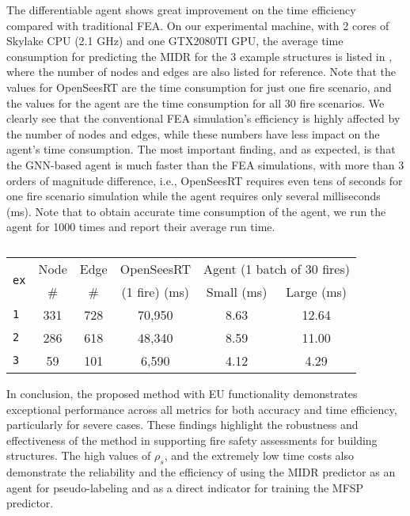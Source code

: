 {\blockRevise
The differentiable agent shows great improvement on the time efficiency compared with traditional FEA. On our experimental machine, with 2 cores of Skylake CPU (2.1 GHz) and one GTX2080TI GPU, the average time consumption for predicting the MIDR for the 3 example structures is listed in , where the number of nodes and edges are also listed for reference. Note that the values for OpenSeesRT are the time consumption for just one fire scenario, and the values for the agent are the time consumption for all 30 fire scenarios. We clearly see that the conventional FEA simulation's efficiency is highly affected by the number of nodes and edges, while these numbers have less impact on the agent's time consumption. The most important finding, and as expected, is that the GNN-based agent is much faster than the FEA simulations, with more than 3 orders of magnitude difference, i.e., OpenSeesRT requires even tens of seconds for one fire scenario simulation while the agent requires only several milliseconds (ms). Note that to obtain accurate time consumption of the agent, we run the agent for 1000 times and report their average run time.
\begin{table}[h!]
    \centering
    \caption{}
    \begin{tabular}{l|cc|ccc}
        \toprule
        \multirow{2}{*}{\texttt{ex}} & Node & Edge & OpenSeesRT & \multicolumn{2}{c}{Agent (1 batch of 30 fires)} \\ 
        \cmidrule(lr){5-6}
        & \# & \# & (1 fire) (ms) & Small (ms) & Large (ms) \\
        \midrule
        \texttt{1} & 331 & 728 & 70,950 & 8.63 & 12.64  \\  
        \texttt{2} & 286 & 618 & 48,340 & 8.59 & 11.00  \\  
        \texttt{3} & 59  & 101 & 6,590  & 4.12 & 4.29 \\  
        \bottomrule
    \end{tabular}
    \label{tab:midrp_time}
\end{table}

In conclusion, the proposed method with EU functionality demonstrates exceptional performance across all metrics for both accuracy and time efficiency, particularly for severe cases. These findings highlight the robustness and effectiveness of the method in supporting fire safety assessments for building structures. The high values of $\rho_s$, and the extremely low time costs also demonstrate the reliability and the efficiency of using the MIDR predictor as an agent for pseudo-labeling and as a direct indicator for training the MFSP predictor. 
} %

